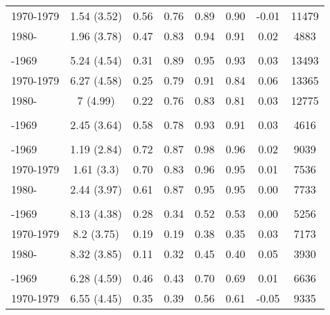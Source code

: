\begin{ThreePartTable}
\begin{longtable}[t]{lccccccc}
\hspace{1em}1970-1979 & 1.54 (3.52) & 0.56 & 0.76 & 0.89 & 0.90 & -0.01 & 11479\\
\hspace{1em}1980- & 1.96 (3.78) & 0.47 & 0.83 & 0.94 & 0.91 & 0.02 & 4883\\
\addlinespace[0.3em]
\multicolumn{8}{l}{\textbf{Cameroon}}\\
\hspace{1em}-1969 & 5.24 (4.54) & 0.31 & 0.89 & 0.95 & 0.93 & 0.03 & 13493\\
\hspace{1em}1970-1979 & 6.27 (4.58) & 0.25 & 0.79 & 0.91 & 0.84 & 0.06 & 13365\\
\hspace{1em}1980- & 7 (4.99) & 0.22 & 0.76 & 0.83 & 0.81 & 0.03 & 12775\\
\addlinespace[0.3em]
\multicolumn{8}{l}{\textbf{Central African Republic}}\\
\hspace{1em}-1969 & 2.45 (3.64) & 0.58 & 0.78 & 0.93 & 0.91 & 0.03 & 4616\\
\addlinespace[0.3em]
\multicolumn{8}{l}{\textbf{Chad}}\\
\hspace{1em}-1969 & 1.19 (2.84) & 0.72 & 0.87 & 0.98 & 0.96 & 0.02 & 9039\\
\hspace{1em}1970-1979 & 1.61 (3.3) & 0.70 & 0.83 & 0.96 & 0.95 & 0.01 & 7536\\
\hspace{1em}1980- & 2.44 (3.97) & 0.61 & 0.87 & 0.95 & 0.95 & 0.00 & 7733\\
\addlinespace[0.3em]
\multicolumn{8}{l}{\textbf{Congo}}\\
\hspace{1em}-1969 & 8.13 (4.38) & 0.28 & 0.34 & 0.52 & 0.53 & 0.00 & 5256\\
\hspace{1em}1970-1979 & 8.2 (3.75) & 0.19 & 0.19 & 0.38 & 0.35 & 0.03 & 7173\\
\hspace{1em}1980- & 8.32 (3.85) & 0.11 & 0.32 & 0.45 & 0.40 & 0.05 & 3930\\
\addlinespace[0.3em]
\multicolumn{8}{l}{\textbf{DR Congo}}\\
\hspace{1em}-1969 & 6.28 (4.59) & 0.46 & 0.43 & 0.70 & 0.69 & 0.01 & 6636\\
\hspace{1em}1970-1979 & 6.55 (4.45) & 0.35 & 0.39 & 0.56 & 0.61 & -0.05 & 9335\\

\end{longtable}
\end{ThreePartTable}
